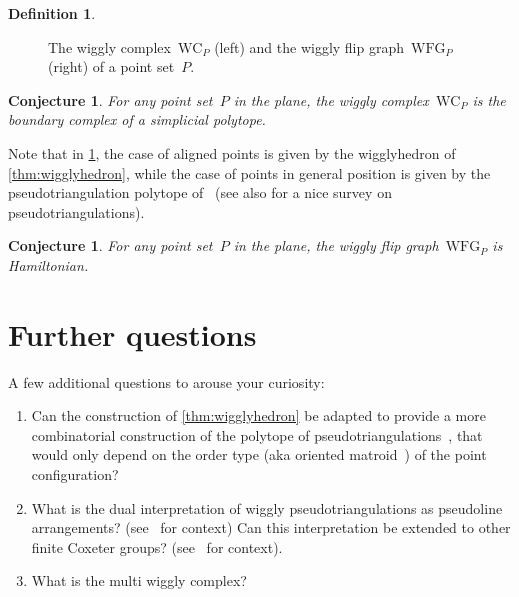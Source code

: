 \documentclass{amsart}
\newtheorem{conjecture}[theorem]{Conjecture}
\theoremstyle{definition}
\newtheorem{definition}[theorem]{Definition}
\newcommand{\wigglyComplex}{\mathrm{WC}} %
\newcommand{\wigglyFlipGraph}{\mathrm{WFG}} %
\begin{document}
\begin{definition}
\begin{figure}[!h]
\caption{The wiggly complex~$\wigglyComplex_P$ (left) and the wiggly flip graph~$\wigglyFlipGraph_P$ (right) of a point set~$P$.}
\label{fig:wigglyComplexSquarre}
\end{figure}
\end{definition}

\begin{conjecture}
\label{conj:polytopality}
For any point set~$P$ in the plane, the wiggly complex~$\wigglyComplex_P$ is the boundary complex of a simplicial polytope.
\end{conjecture}

Note that in \cref{conj:polytopality}, the case of aligned points is given by the wigglyhedron of \cref{thm:wigglyhedron}, while the case of points in general position is given by the pseudotriangulation polytope of~\cite{RoteSantosStreinu-polytope} (see also \cite{RoteSantosStreinu-pseudotriangulations} for a nice survey on pseudotriangulations).

\begin{conjecture}
\label{conj:Hamiltonian2}
For any point set~$P$ in the plane, the wiggly flip graph~$\wigglyFlipGraph_P$ is Hamiltonian.
\end{conjecture}


\section{Further questions}

A few additional questions to arouse your curiosity:
\begin{enumerate}
\item Can the construction of \cref{thm:wigglyhedron} be adapted to provide a more combinatorial construction of the polytope of pseudotriangulations~\cite{RoteSantosStreinu-polytope}, that would only depend on the order type (aka oriented matroid~\cite{BjornerLasVergnasSturmfelsWhiteZiegler}) of the point configuration?
\item What is the dual interpretation of wiggly pseudotriangulations as pseudoline arrangements? (see~\cite{PilaudPocchiola} for context) Can this interpretation be extended to other finite Coxeter groups? (see~\cite{CeballosLabbeStump} for context).
\item What is the multi wiggly complex?
\end{enumerate}



{}


\label{sec:biblio}
\end{document}
